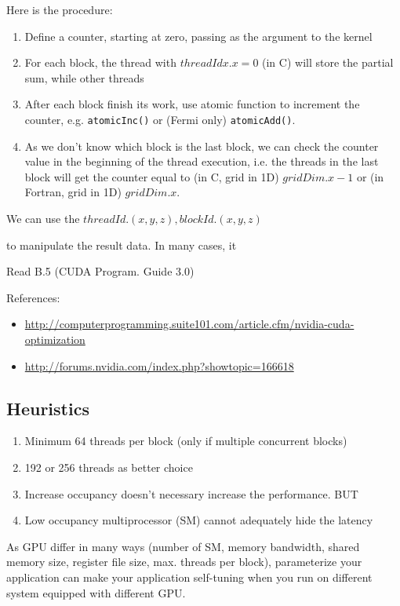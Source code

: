 Here is the procedure:
\begin{enumerate}
\item Define a counter, starting at zero, passing as the argument to
  the kernel
\item For each block, the thread with $threadIdx.x=0$ (in C) will
  store the partial sum, while other threads
\item After each block finish its work, use atomic function to
  increment the counter, e.g. \verb!atomicInc()! or (Fermi only)
  \verb!atomicAdd()!.
\item As we don't know which block is the last block, we can check the
  counter value in the beginning of the thread execution, i.e. the
  threads in the last block will get the counter equal to (in C, grid
  in 1D) $gridDim.x-1$ or (in Fortran, grid in 1D) $gridDim.x$.
\end{enumerate}
We can use the $threadId.(x,y,z), blockId.(x,y,z)$ 


to manipulate
the result data.  In many cases, it

Read B.5  (CUDA Program. Guide 3.0)

References:
\begin{itemize}
\item
  \url{http://computerprogramming.suite101.com/article.cfm/nvidia-cuda-optimization}
\item \url{http://forums.nvidia.com/index.php?showtopic=166618}
\end{itemize}

\subsection{Heuristics}
\label{sec:heuristics}

\begin{enumerate}
\item Minimum 64 threads per block (only if multiple concurrent
  blocks)
\item 192 or 256 threads as better choice
\item Increase occupancy doesn't necessary increase the
  performance. BUT
\item Low occupancy multiprocessor (SM) cannot adequately hide the
  latency 
\end{enumerate}
As GPU differ in many ways (number of SM, memory bandwidth, shared
memory size, register file size, max. threads per block), parameterize
your application can make your application self-tuning when you run on
different system equipped with different GPU.

